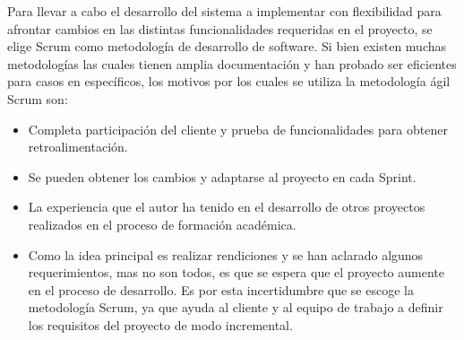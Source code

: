 Para llevar a cabo el desarrollo del sistema a implementar con flexibilidad para afrontar cambios en las distintas funcionalidades requeridas en el proyecto, se elige Scrum como metodología de desarrollo de software. Si bien existen muchas metodologías las cuales tienen amplia documentación y han probado ser eficientes para casos en específicos, los motivos por los cuales se utiliza la metodología ágil Scrum son:

\begin{itemize}
    \item Completa participación del cliente y prueba de funcionalidades para obtener retroalimentación.

    \item Se pueden obtener los cambios y adaptarse al proyecto en cada Sprint.
    
    \item La experiencia que el autor ha tenido en el desarrollo de otros proyectos realizados en el proceso de formación académica.
    
    \item Como la idea principal es realizar rendiciones y se han aclarado algunos requerimientos, mas no son todos, es que se espera que el proyecto aumente en el proceso de desarrollo. Es por esta incertidumbre que se escoge la metodología Scrum, ya que ayuda al cliente y al equipo de trabajo a definir los requisitos del proyecto de modo incremental.
\end{itemize}